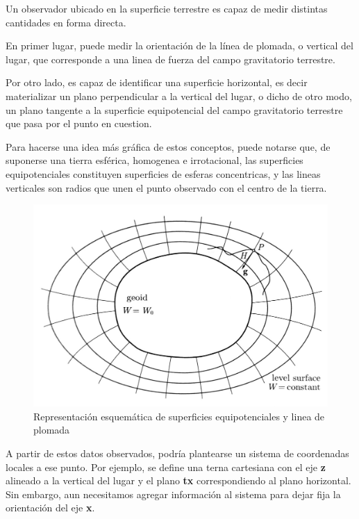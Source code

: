 \documentclass{tufte-book}
\begin{document}
Un observador ubicado en la superficie terrestre es capaz de medir distintas cantidades en
forma directa.

En primer lugar, puede medir la orientación de la línea de plomada, o vertical del lugar,
que corresponde a una linea de fuerza del campo gravitatorio terrestre.

Por otro lado, es capaz de identificar una superficie horizontal, es decir materializar un
plano perpendicular a la vertical del lugar, o dicho de otro modo, un plano tangente a la
superficie equipotencial del campo gravitatorio terrestre que pasa por el punto en cuestion.

Para hacerse una idea más gráfica de estos conceptos, puede notarse que, de suponerse una tierra
esférica, homogenea e irrotacional, las superficies equipotenciales constituyen superficies de
esferas concentricas, y las lineas verticales son radios que unen el punto observado con el
centro de la tierra.

\begin{figure}
  \label{fig:equipotenciales}
  \caption{Representación esquemática de superficies equipotenciales y linea de plomada}
  \includegraphics{./imgs/Equipotenciales.jpg}
\end{figure}

A partir de estos datos observados, podría plantearse un sistema de coordenadas locales a ese
punto. Por ejemplo, se define una terna cartesiana con el eje \textbf{z} alineado a la vertical del lugar
y el plano \textbf{tx} correspondiendo al plano horizontal. Sin embargo, aun necesitamos agregar
información al sistema para dejar fija la orientación del eje \textbf{x}. 
\end{document}
